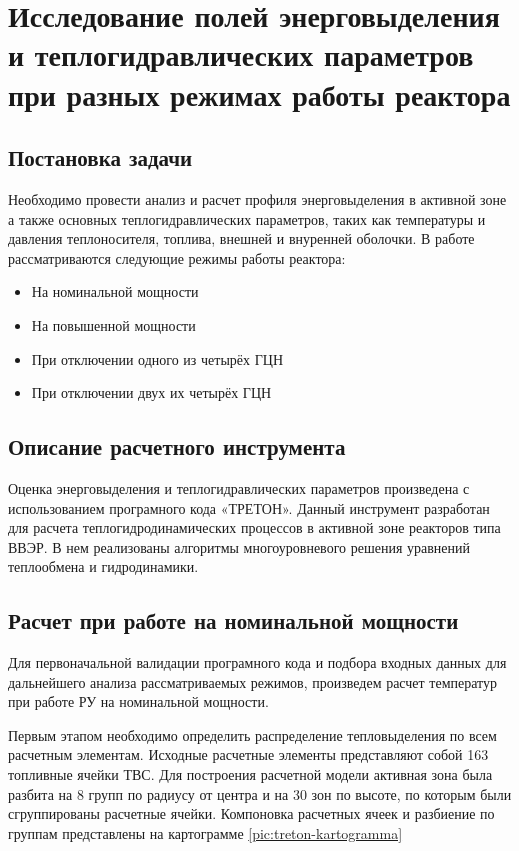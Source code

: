 \section{Исследование полей энерговыделения и теплогидравлических параметров при разных режимах работы реактора}

\subsection{Постановка задачи}
Необходимо провести анализ и расчет профиля энерговыделения в активной зоне а также основных теплогидравлических параметров, таких как температуры и давления теплоносителя, топлива, внешней и внуренней оболочки. В работе рассматриваются следующие режимы работы реактора:
\begin{itemize}
    \item На номинальной мощности
    \item На повышенной мощности
    \item При отключении одного из четырёх ГЦН
    \item При отключении двух их четырёх ГЦН
\end{itemize}

\subsection{Описание расчетного инструмента}
Оценка энерговыделения и теплогидравлических параметров произведена с использованием програмного кода «ТРЕТОН». Данный инструмент разработан для расчета теплогидродинамических процессов в активной зоне реакторов типа ВВЭР. В нем реализованы алгоритмы многоуровневого решения уравнений теплообмена и гидродинамики.


\subsection{Расчет при работе на номинальной мощности}
Для первоначальной валидации програмного кода и подбора входных данных для дальнейшего анализа рассматриваемых режимов, произведем расчет температур при работе РУ на номинальной мощности.

Первым этапом необходимо определить распределение тепловыделения по всем расчетным элементам. Исходные расчетные элементы представляют собой 163 топливные ячейки ТВС. Для построения расчетной модели активная зона была разбита на 8 групп по радиусу от центра и на 30 зон по высоте, по которым были сгруппированы расчетные ячейки. Компоновка расчетных ячеек и разбиение по группам представлены на картограмме \ref{pic:treton-kartogramma}


